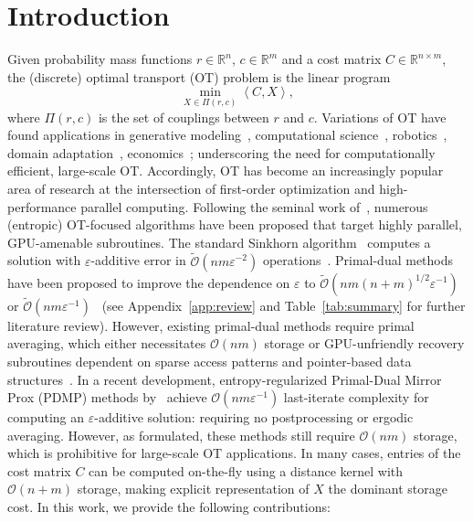 \documentclass[10pt]{article}
\newcommand{\R}{\mathbb{R}}
\renewcommand{\O}{\mathcal{O}}
\newcommand{\tO}{\widetilde{\O}}
\newcommand{\inner}[2]{\left\langle #1,#2\right\rangle}
\newcommand{\coup}{\Pi}
\theoremstyle{plain}
\theoremstyle{definition}
\theoremstyle{remark}
\begin{document}
\section{Introduction}\label{sec:intro}
Given probability mass functions $r\in\R^n$, $c\in\R^m$ and a cost matrix $C\in\R^{n\times m}$, the (discrete) optimal transport (OT) problem is the linear program
\begin{equation}\label{prob:primal_ot}
\min_{X\in\coup(r,c)}\inner{C}{X},
\end{equation}
where $\coup(r,c)$ is the set of couplings between $r$ and $c$. Variations of OT have found applications in generative modeling~\cite{arjovskyWassersteinGAN2017}, computational science~\cite{levyFastSemidiscreteOptimal2021,huizingOptimalTransportImproves2022}, robotics~\cite{yaoVisualTrackingUsing2018}, domain adaptation~\cite{courtyOptimalTransportDomain2017}, economics~\cite{galichonOptimalTransportMethods2016};  underscoring the need for computationally efficient, large-scale OT. Accordingly, OT has become an increasingly popular area of research at the intersection of first-order optimization and high-performance parallel computing. Following the seminal work of~\cite{cuturiSinkhornDistancesLightspeed2013}, numerous (entropic) OT-focused algorithms have been proposed that target highly parallel, GPU-amenable subroutines. The standard Sinkhorn algorithm~\cite{sinkhornConcerningNonnegativeMatrices1967,cuturiSinkhornDistancesLightspeed2013} computes a solution with $\varepsilon$-additive error in $\tO(nm\varepsilon^{-2})$ operations~\cite{dvurechenskyComputationalOptimalTransport2018}. Primal-dual methods have been proposed to improve the dependence on $\varepsilon$ to $\tO(nm(n+m)^{1/2}\varepsilon^{-1})$~\cite{dvurechenskyComputationalOptimalTransport2018,guminovCombinationAlternatingMinimization2021,linEfficiencyEntropicRegularized2022} or  $\tO(nm\varepsilon^{-1})$~\cite{jambulapatiDirectTildelbraceOrbrace2019a,maiFastAccurateSplitting2021a,luoImprovedRateFirst2023} (see Appendix~\ref{app:review} and Table~\ref{tab:summary} for further literature review). However, existing primal-dual methods require primal averaging, which either necessitates $\mathcal{O}(nm)$ storage or GPU-unfriendly recovery subroutines dependent on sparse access patterns and pointer-based data structures~\cite{assadiSemiStreamingBipartiteMatching2022}. In a recent development, entropy-regularized Primal-Dual Mirror Prox (PDMP) methods by~\cite{cen2024fast,liFastComputationOptimal2025} achieve $\mathcal{O}(nm\varepsilon^{-1})$ last-iterate complexity for computing an $\varepsilon$-additive solution: requiring no postprocessing or ergodic averaging. However, as formulated, these methods still require $\mathcal{O}(nm)$ storage, which is prohibitive for large-scale OT applications. In many cases, entries of the cost matrix $C$ can be computed on-the-fly using a distance kernel with $\mathcal{O}(n+m)$ storage, making explicit representation of $X$ the dominant storage cost. In this work, we provide the following contributions:
\end{document}
